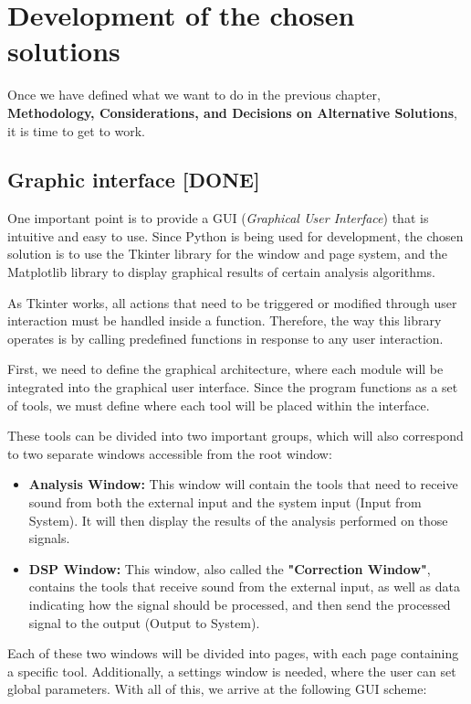 \chapter{Development of the chosen solutions}

Once we have defined what we want to do in the previous chapter, \textbf{Methodology, Considerations, and Decisions on Alternative Solutions}, it is time to get to work.

\section{Graphic interface [DONE]}

One important point is to provide a GUI (\textit{Graphical User Interface}) that is intuitive and easy to use. Since Python is being used for development, the chosen solution is to use the Tkinter\cite{Tkinter} library for the window and page system, and the Matplotlib\cite{Matplotlib} library to display graphical results of certain analysis algorithms.

As Tkinter works, all actions that need to be triggered or modified through user interaction must be handled inside a function. Therefore, the way this library operates is by calling predefined functions in response to any user interaction.

First, we need to define the graphical architecture, where each module will be integrated into the graphical user interface. Since the program functions as a set of tools, we must define where each tool will be placed within the interface.

These tools can be divided into two important groups, which will also correspond to two separate windows accessible from the root window:

\begin{itemize}
	\item \textbf{Analysis Window:} This window will contain the tools that need to receive sound from both the external input and the system input (Input from System). It will then display the results of the analysis performed on those signals.
	\item \textbf{DSP Window:} This window, also called the \textbf{"Correction Window"}, contains the tools that receive sound from the external input, as well as data indicating how the signal should be processed, and then send the processed signal to the output (Output to System).
\end{itemize}

Each of these two windows will be divided into pages, with each page containing a specific tool. Additionally, a settings window is needed, where the user can set global parameters. With all of this, we arrive at the following GUI scheme:

